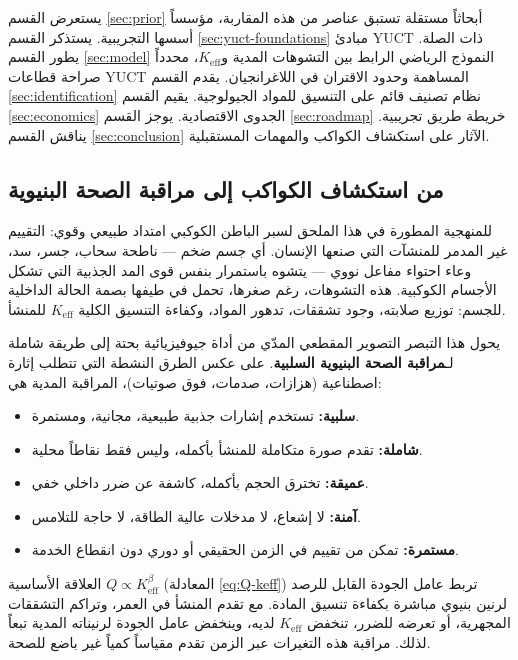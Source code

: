 \documentclass[12pt,a4paper]{article}
\newcommand{\Keff}{K_{\mathrm{eff}}}
\theoremstyle{remark}
\begin{document}
	يستعرض القسم \ref{sec:prior} أبحاثاً مستقلة تستبق عناصر من هذه المقاربة، مؤسساً أسسها التجريبية. يستذكر القسم \ref{sec:yuct-foundations} مبادئ YUCT ذات الصلة. يطور القسم \ref{sec:model} النموذج الرياضي الرابط بين التشوهات المدية و\(\Keff\)، محدداً صراحة قطاعات YUCT المساهمة وحدود الاقتران في اللاغرانجيان. يقدم القسم \ref{sec:identification} نظام تصنيف قائم على التنسيق للمواد الجيولوجية. يقيم القسم \ref{sec:economics} الجدوى الاقتصادية. يوجز القسم \ref{sec:roadmap} خريطة طريق تجريبية. يناقش القسم \ref{sec:conclusion} الآثار على استكشاف الكواكب والمهمات المستقبلية.
	
	\subsection{من استكشاف الكواكب إلى مراقبة الصحة البنيوية}
	\label{sec:beyond-geophysics}
	
	للمنهجية المطورة في هذا الملحق لسبر الباطن الكوكبي امتداد طبيعي وقوي: التقييم غير المدمر للمنشآت التي صنعها الإنسان. أي جسم ضخم — ناطحة سحاب، جسر، سد، وعاء احتواء مفاعل نووي — يتشوه باستمرار بنفس قوى المد الجذبية التي تشكل الأجسام الكوكبية. هذه التشوهات، رغم صغرها، تحمل في طيفها بصمة الحالة الداخلية للجسم: توزيع صلابته، وجود تشققات، تدهور المواد، وكفاءة التنسيق الكلية \(K_{\mathrm{eff}}\) للمنشأ.
	
	يحول هذا التبصر التصوير المقطعي المدّي من أداة جيوفيزيائية بحتة إلى طريقة شاملة لـ\textbf{مراقبة الصحة البنيوية السلبية}. على عكس الطرق النشطة التي تتطلب إثارة اصطناعية (هزازات، صدمات، فوق صوتيات)، المراقبة المدية هي:
	\begin{itemize}
		\item \textbf{سلبية:} تستخدم إشارات جذبية طبيعية، مجانية، ومستمرة.
		\item \textbf{شاملة:} تقدم صورة متكاملة للمنشأ بأكمله، وليس فقط نقاطاً محلية.
		\item \textbf{عميقة:} تخترق الحجم بأكمله، كاشفة عن ضرر داخلي خفي.
		\item \textbf{آمنة:} لا إشعاع، لا مدخلات عالية الطاقة، لا حاجة للتلامس.
		\item \textbf{مستمرة:} تمكن من تقييم في الزمن الحقيقي أو دوري دون انقطاع الخدمة.
	\end{itemize}
	
	العلاقة الأساسية \(Q \propto K_{\mathrm{eff}}^{\beta}\) (المعادلة \ref{eq:Q-keff}) تربط عامل الجودة القابل للرصد لرنين بنيوي مباشرة بكفاءة تنسيق المادة. مع تقدم المنشأ في العمر، وتراكم التشققات المجهرية، أو تعرضه للضرر، تنخفض \(K_{\mathrm{eff}}\) لديه، وينخفض عامل الجودة لرنيناته المدية تبعاً لذلك. مراقبة هذه التغيرات عبر الزمن تقدم مقياساً كمياً غير باضع للصحة.
	
\end{document}
